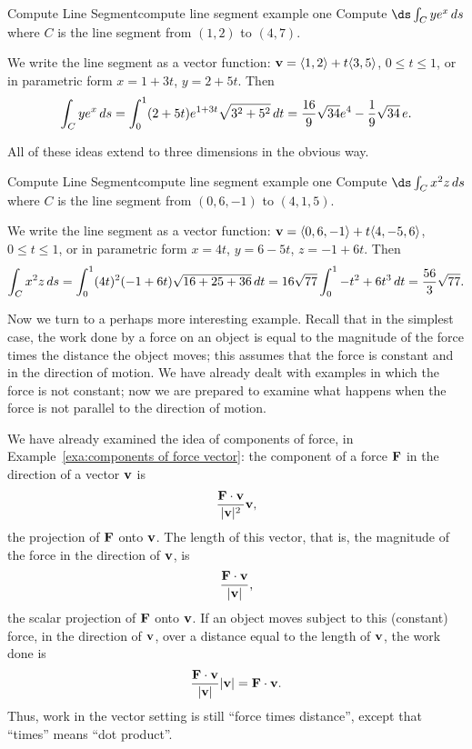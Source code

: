 \begin{example}{Compute Line Segment}{compute line segment example one}
Compute $\ds\int_C ye^x\,ds$ where $C$ is the line segment from
$(1,2)$ to $(4,7)$.
\end{example}
\begin{solution}
We write the line segment as a vector function: ${\bf v}=\langle
1,2\rangle + t\langle 3,5\rangle$, $0\le t\le 1$, or in parametric
form $x=1+3t$, $y=2+5t$. Then
$$\int_C ye^x\,ds = \int_0^1 (2+5t)e^{1+3t}\sqrt{3^2+5^2}\,dt
={16\over 9}\sqrt{34}e^4-{1\over9}\sqrt{34}\,e.
$$
\end{solution}

All of these ideas extend to three dimensions in the obvious way.

\begin{example}{Compute Line Segment}{compute line segment example one}
Compute $\ds\int_C x^2  z \,ds$ where $C$ is the line segment
from $(0,6,-1)$ to $(4,1,5)$.
\end{example}
\begin{solution}
We write the line segment as a vector function: ${\bf v}=\langle
0,6,-1\rangle + t\langle 4,-5,6\rangle$, $0\le t\le 1$, or in parametric
form $x=4t$, $y=6-5t$, $z=-1+6t$. Then
$$\int_C x^2 z\,ds = \int_0^1 (4t)^2 (-1+6t)\sqrt{16+25+36}\,dt
=16\sqrt{77}\int_0^1 -t^2+6t^3\,dt={56\over3}\sqrt{77}.
$$
\end{solution}

Now we turn to a perhaps more interesting example. Recall that in the
simplest case, the work done by a force on an object is equal to the
magnitude of the force times the distance the object moves; this
assumes that the force is constant and in the direction of motion. We
have already dealt with examples in which the force is not constant;
now we are prepared to examine what happens when the force is not
parallel to the direction of motion.

We have already examined the idea of components of force, in
Example~\ref{exa:components of force vector}: the component of a
force $\bf F$ in the direction of a vector $\bf v$ is 
$${{\bf F}\cdot {\bf v}\over|{\bf v}|^2}{\bf v},$$
the projection of $\bf F$ onto $\bf v$.
The length of this vector, that is, the magnitude of the force in the
direction of $\bf v$, is 
$${{\bf F}\cdot {\bf v}\over|{\bf v}|},$$
the scalar projection
 of $\bf F$ onto $\bf v$.
If an object moves subject to this (constant) force, in the direction
of $\bf v$, over a distance equal to the length of $\bf v$, the work
done is
$${{\bf F}\cdot {\bf v}\over|{\bf v}|}|{\bf v}|={\bf F}\cdot {\bf v}.$$
Thus, work in the vector setting is still ``force times distance'',
except that ``times'' means ``dot product''.

